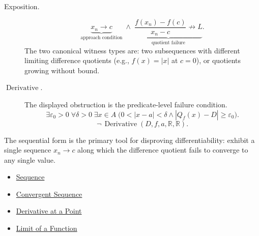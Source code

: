 \begin{remark*}
\begin{description}
  \item[Exposition.]
\[
\underbrace{x_n \to c}_{\text{approach condition}} \;\land\; \underbrace{\frac{f(x_n)-f(c)}{x_n-c} \not\to L}_{\text{quotient failure}}.
\]
The two canonical witness types are: two subsequences with different limiting difference quotients (e.g., $f(x) = |x|$ at $c = 0$), or quotients growing without bound.


  \item[\(\operatorname{Derivative}.\)]
  The displayed obstruction is the predicate-level failure condition.
  \[
  \exists\varepsilon_0>0\;\forall\delta>0\;\exists x\in A\;\bigl(0<|x-a|<\delta\land |Q_f(x)-D|\ge\varepsilon_0\bigr).
  \]
  \[
  \neg\,\operatorname{Derivative}(D,f,a,\mathbb{R},\mathbb{R}).
  \]
\end{description}
\end{remark*}

\begin{remark*}[Interpretation]
The sequential form is the primary tool for disproving differentiability: exhibit a single sequence $x_n \to c$ along which the difference quotient fails to converge to any single value.
\end{remark*}

\begin{dependencies}
\begin{itemize}
  \item \hyperref[def:sequence]{Sequence}
  \item \hyperref[def:convergent-sequence]{Convergent Sequence}
  \item \hyperref[def:derivative-at-a-point]{Derivative at a Point}
  \item \hyperref[def:limit-function]{Limit of a Function}
\end{itemize}
\end{dependencies}


